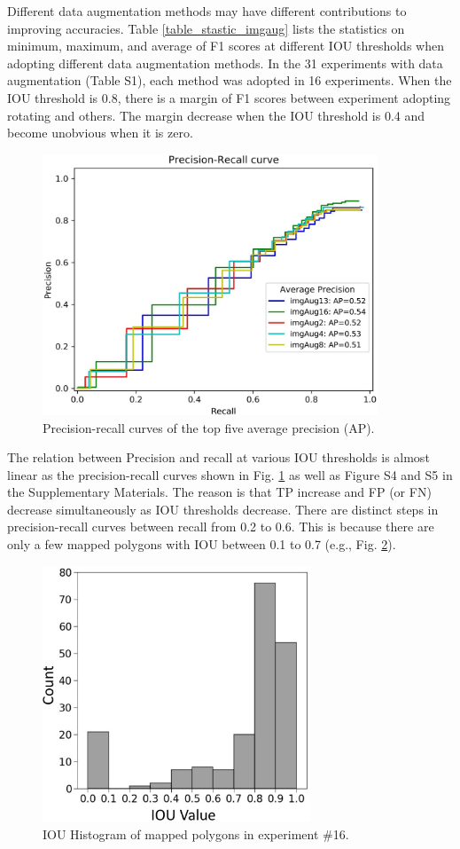 \documentclass[preprint,12pt,authoryear]{elsarticle}
\begin{document}
Different data augmentation methods may have different contributions to improving accuracies. Table \ref{table_stastic_imgaug} lists the statistics on minimum, maximum, and average of F1 scores at different IOU thresholds when adopting different data augmentation methods. In the 31 experiments with data augmentation (Table S1), each method was adopted in 16 experiments. When the IOU threshold is 0.8, there is a margin of F1 scores between experiment adopting rotating and others. The margin decrease when the IOU threshold is 0.4 and become unobvious when it is zero. 

\begin{figure}
	\centering
	\includegraphics[width=10cm]{figures/top5_curves_trim.jpg}
	\caption{Precision-recall curves of the top five average precision (AP).}
	\label{fig_ap_top5}
\end{figure}

The relation between Precision and recall at various IOU thresholds is almost linear as the precision-recall curves shown in Fig. \ref{fig_ap_top5} as well as Figure S4 and S5 in the Supplementary Materials. The reason is that TP increase and FP (or FN) decrease simultaneously as IOU thresholds decrease. There are distinct steps in precision-recall curves between recall from 0.2 to 0.6. This is because there are only a few mapped polygons with IOU between 0.1 to 0.7 (e.g., Fig. \ref{fig_iou_hist_exp16}).

\begin{figure}
	\centering
	\includegraphics[width=8cm]{figures/IoU_imgAug16_label_trim.jpg}
	\caption{IOU Histogram of mapped polygons in experiment \#16.}
	\label{fig_iou_hist_exp16}
\end{figure}
\end{document}
